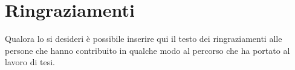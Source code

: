 \chapter*{Ringraziamenti}

Qualora lo si desideri è possibile inserire qui il testo dei ringraziamenti alle persone che hanno contribuito in qualche modo al percorso che ha portato al lavoro di tesi.